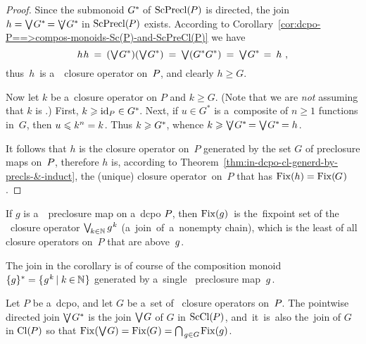 \documentclass[11pt,letterpaper]{article}
\renewcommand{\emph}[1]{\textit{#1\/}}
\renewcommand{\thmskip}{\bigskip}
\begin{document}
\begin{proof}
Since the submonoid $G^*\mspace{-2mu}$ of $\mspace{1mu}\mathop{\smash{\mathrm{ScPrecl}}}\nolimits(\mspace{-1mu} P)$ is directed,
the join
    $h = \tJoin\negdtinysp G^*\negdtinysp
	= \dottJoin\negdtinysp G^*\negdtinysp$
		in $\mathop{\smash{\mathrm{ScPrecl}}}\nolimits(\mspace{-1mu} P)$ exists.
According to Corollary~\ref{cor:dcpo-P==>compos-monoids-Sc(P)-and-ScPreCl(P)}
we have
%
\begin{equation*}
h\mspace{1mu} h \:=\: (\mathop{\textstyle\bigvee}\nolimits\mspace{-2mu} G^*)(\mathop{\textstyle\bigvee}\nolimits\mspace{-2mu} G^*)
	\:=\: \mathop{\textstyle\bigvee}\nolimits(G^*G^*)
	\:=\: \mathop{\textstyle\bigvee}\nolimits\mspace{-2mu} G^*\mspace{-2mu}
	\:=\: h~,
\end{equation*}
%
thus~$h$~is a~\Scottcont\ closure operator on~$P\mspace{-1mu}$, and clearly $h\geq G$.

\pagebreak[3]

Now let $k$ be a~closure operator on $P$ and $k\geq G$.
{\large(}Note that we are \emph{not} assuming that $k$ is \Scottcont.{\large)}
First, $k\geqslant\mathrm{id}_P\in G^*\mspace{-2mu}$.
Next, if $u\in G^*$ is a~composite of $n\geq 1$ functions in~$G$, then $u\leqslant k^n = k\mspace{1mu}$.
Thus $k\geqslant G^*\mspace{-2mu}$, whence
    $k\geq \dottJoin\negdtinysp G^*\negdtinysp
	= \tJoin\negdtinysp G^*\negdtinysp
	= h\tinysp$.

It follows that $h$ is the closure operator on~$P$
generated by the set $G$ of preclosure maps on~$P\mspace{-1mu}$,
therefore $h$ is, according to Theorem~\ref{thm:in-dcpo-cl-generd-by-precls-&-induct},
	the (unique) closure operator~on~$P$ that has $\mathop{\smash{\mathrm{Fix}}}\nolimits(h)=\mathop{\smash{\mathrm{Fix}}}\nolimits(\mspace{-1mu} G\mspace{1mu})\mspace{1mu}$.
\end{proof}

\thmskip

\begin{corollary}\label{cor:single-Scottcont-preclmap-geners-Scottcont-clop}
If\/ $g$ is a~\Scottcont\ preclosure map on a~dcpo\/ $P\mspace{-1mu}$,
then\/ $\mathop{\smash{\mathrm{Fix}}}\nolimits(g)$~is the~fixpoint set of the
	\Scottcont\ closure operator\/ $\mathop{\textstyle\bigvee}\nolimits_{\!k\in\mathbb{N}} g^{\mspace{1mu} k}$
		{\rm(}a~join~of~a~nonempty chain\/{\rm)},
which is the least of all closure operators on\/~$P$ that are above\/~$g\mspace{1mu}$.
\end{corollary}

\thmskip

The join in the corollary is of course of the composition monoid
	$\{ g \}^* = \{ \mspace{1mu} g^{\mspace{1mu} k}\mspace{-2mu}\mid k\mspace{-1mu}\in\mspace{-1mu}\mathbb{N}\mspace{1mu} \}$
generated by a~single \Scottcont\ preclosure map~$g\mspace{1mu}$.

\thmskip

\begin{corollary}\label{cor:dcpo-P-joins-in-ScCl(P)}
Let\/ $P$ be a~dcpo, and let\/ $G$ be a~set of \Scottcont\ closure operators on\/~$P\mspace{-1mu}$.
The pointwise directed join\/ $\dottJoin\negdtinysp G^*$
is the join\/ $\mathop{\textstyle\bigvee}\nolimits\mspace{-2mu} G$ of\/ $G$ in\/ $\mathop{\smash{\mathrm{ScCl}}}\nolimits(\mspace{-1mu} P)\mspace{1mu}$,
and~it~is~also the~join of\/ $G$ in\/ $\mathop{\smash{\mathrm{Cl}}}\nolimits(\mspace{-1mu} P)$ so that\/
    $\mathop{\smash{\mathrm{Fix}}}\nolimits(\mathop{\textstyle\bigvee}\nolimits\mspace{-2mu} G)
	= \mathop{\smash{\mathrm{Fix}}}\nolimits(\mspace{-1mu} G\mspace{1mu})
	= \bigcap_{\mspace{2mu} g\in G\mspace{-2mu}}\mathop{\smash{\mathrm{Fix}}}\nolimits(g)\mspace{1mu}$.
\end{corollary}
\end{document}

